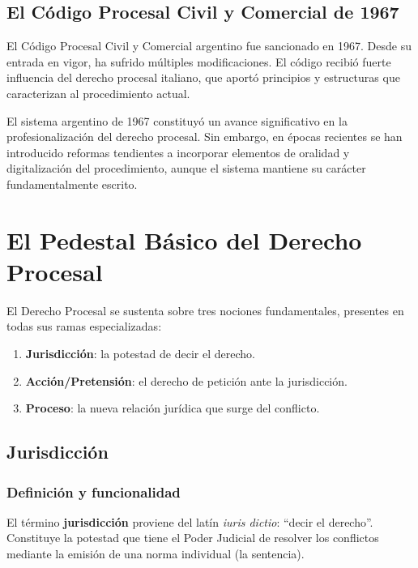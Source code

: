 \documentclass[12pt,oneside]{book}
\begin{document}
\section{El Código Procesal Civil y Comercial de 1967}

El Código Procesal Civil y Comercial argentino fue sancionado en 1967. Desde su entrada en vigor, ha sufrido múltiples modificaciones. El código recibió fuerte influencia del derecho procesal italiano, que aportó principios y estructuras que caracterizan al procedimiento actual.

El sistema argentino de 1967 constituyó un avance significativo en la profesionalización del derecho procesal. Sin embargo, en épocas recientes se han introducido reformas tendientes a incorporar elementos de oralidad y digitalización del procedimiento, aunque el sistema mantiene su carácter fundamentalmente escrito.


\chapter{El Pedestal Básico del Derecho Procesal}

El Derecho Procesal se sustenta sobre tres nociones fundamentales, presentes en todas sus ramas especializa­das:

\begin{enumerate}
    \item \textbf{Jurisdicción}: la potestad de decir el derecho.
    \item \textbf{Acción/Pretensión}: el derecho de petición ante la jurisdicción.
    \item \textbf{Proceso}: la nueva relación jurídica que surge del conflicto.
\end{enumerate}

\section{Jurisdicción}

\subsection{Definición y funcionalidad}

El término \textbf{jurisdicción} proviene del latín \textit{iuris dictio}: ``decir el derecho''. Constituye la potestad que tiene el Poder Judicial de resolver los conflictos mediante la emisión de una norma individual (la sentencia).
\end{document}
